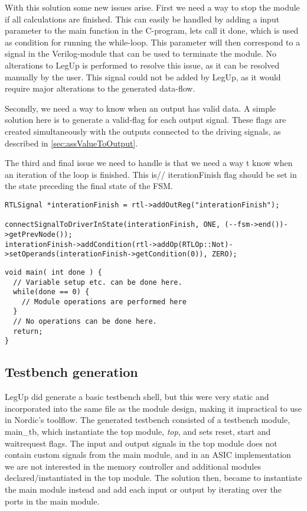With this solution some new issues arise. 
First we need a way to stop the module if all calculations are finished. This can easily be handled by adding a input parameter to the main function in the C-program, lets call it done, which is used as condition for running the while-loop. This parameter will then correspond to a signal in the Verilog-module that can be used to terminate the module. No alterations to LegUp is performed to resolve this issue, as it can be resolved manually by the user. This signal could not be added by LegUp, as it would require major alterations to the generated data-flow.

Secondly, we need a way to know when an output has valid data. A simple solution here is to generate a valid-flag for each output signal. These flags are created simultaneously with the outputs connected to the driving signals, as described in \ref{sec:assValueToOutput}.

The third and final issue we need to handle is that we need a way t know when an iteration of the loop is finished. This is// iterationFinish flag should be set in the state preceding the final state of the FSM.
\lstset{language=C,style=Cstyle}
\begin{lstlisting}
RTLSignal *interationFinish = rtl->addOutReg("interationFinish");

connectSignalToDriverInState(interationFinish, ONE, (--fsm->end())->getPrevNode());
interationFinish->addCondition(rtl->addOp(RTLOp::Not)->setOperands(interationFinish->getCondition(0)), ZERO);
\end{lstlisting}
\begin{lstlisting}[caption={FIR-filter implemented in C},label=lst:firfilterc]
void main( int done ) {
  // Variable setup etc. can be done here.
  while(done == 0) {
    // Module operations are performed here
  }
  // No operations can be done here.
  return;
}
\end{lstlisting}

\subsection{Testbench generation}
LegUp did generate a basic testbench shell, but this were very static and incorporated into the same file as the module design, making it impractical to use in Nordic's toolflow. The generated testbench consisted of a testbench module, main\_tb, which instantiate the top module, \textit{top}, and sets reset, start and waitrequest flags. The input and output signals in the top module does not contain custom signals from the main module, and in an ASIC implementation we are not interested in the memory controller and additional modules declared/instantiated in the top module. The solution then, became to instantiate the main module instead and add each input or output by iterating over the ports in the main module.

